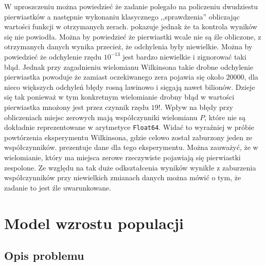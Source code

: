 \documentclass[11pt]{mk-polish-lab-report}
\begin{document}
W uproszczeniu można powiedzieć że zadanie polegało na policzeniu dwudziestu pierwiastków a następnie wykonaniu klasycznego ,,sprawdzenia'' obliczając wartości funkcji w otrzymanych zerach.  pokazuje jednak że ta kontrola wyników się nie powiodła. Można by powiedzieć że pierwiastki wcale nie są źle obliczone, z otrzymanych danych wynika przecież, że odchylenia były niewielkie. Można by powiedzieć że odchylenie rzędu $10^{-13}$ jest bardzo niewielkie i zignorować taki błąd. Jednak przy zagadnieniu wielomianu Wilkinsona takie drobne odchylenie pierwiastka powoduje że zamiast oczekiwanego zera pojawia się około $20 000$, dla nieco większych odchyleń błędy rosną lawinowo i sięgają nawet bilionów. Dzieje się tak ponieważ w tym konkretnym wielomianie drobny błąd w wartości pierwiastka mnożony jest przez czynnik rzędu $19!$. Wpływ na błędy przy obliczeniach miejsc zerowych mają współczynniki wielomianu $P$, które nie są dokładnie reprezentowane w arytmetyce \texttt{Float64}. Widać to wyraźniej w próbie powtórzenia eksperymentu Wilkinsona, gdzie celowo został zaburzony jeden ze współczynników.  prezentuje dane dla tego eksperymentu. Można zauważyć, że w wielomianie, który ma miejsca zerowe rzeczywiste pojawiają się pierwiastki zespolone. Ze względu na tak duże odkształcenia wyników wynikłe z zaburzenia współczynników przy niewielkich zmianach danych można mówić o tym, że zadanie to jest źle uwarunkowane.

\section{Model wzrostu populacji}

\subsection{Opis problemu}
\end{document}

